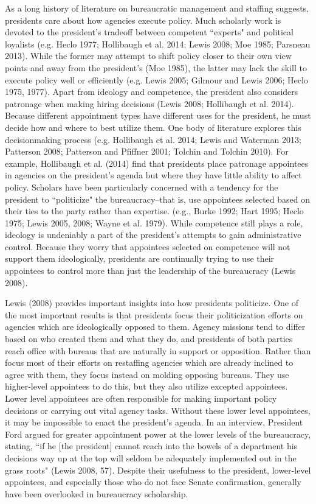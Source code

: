 \documentclass[12pt]{article}
\begin{document}
	As a long history of literature on bureaucratic management and staffing suggests, presidents care about how agencies execute policy. Much scholarly work is devoted to the president's tradeoff between competent ``experts" and political loyalists (e.g. Heclo 1977; Hollibaugh et al. 2014; Lewis 2008; Moe 1985; Parsneau 2013). While the former may attempt to shift policy closer to their own view points and away from the president's (Moe 1985), the latter may lack the skill to execute policy well or efficiently (e.g. Lewis 2005; Gilmour and Lewis 2006; Heclo 1975, 1977). Apart from ideology and competence, the president also considers patronage when making hiring decisions (Lewis 2008; Hollibaugh et al. 2014). Because different appointment types have different uses for the president, he must decide how and where to best utilize them. One body of literature explores this decisionmaking process (e.g. Hollibaugh et al. 2014; Lewis and Waterman 2013; Patterson 2008; Patterson and Pfiffner 2001; Tolchin and Tolchin 2010). For example, Hollibaugh et al. (2014) find that presidents place patronage appointees in agencies on the president's agenda but where they have little ability to affect policy. Scholars have been particularly concerned with a tendency for the president to ``politicize" the bureaucracy--that is, use appointees selected based on their ties to the party rather than expertise. (e.g., Burke 1992; Hart 1995; Heclo 1975; Lewis 2005, 2008; Wayne et al. 1979). While competence still plays a role, ideology is undeniably a part of the president's attempts to gain administrative control. Because they worry that appointees selected on competence will not support them ideologically, presidents are continually trying to use their appointees to control more than just the leadership of the bureaucracy (Lewis 2008).
	
Lewis (2008) provides important insights into how presidents politicize. One of the most important results is that presidents focus their politicization efforts on agencies which are ideologically opposed to them. Agency missions tend to differ based on who created them and what they do, and presidents of both parties reach office with bureaus that are naturally in support or opposition. Rather than focus most of their efforts on restaffing agencies which are already inclined to agree with them, they focus instead on molding opposing bureaus. They use higher-level appointees to do this, but they also utilize excepted appointees. Lower level appointees are often responsible for making important policy decisions or carrying out vital agency tasks. Without these lower level appointees, it may be impossible to enact the president's agenda. In an interview, President Ford argued for greater appointment power at the lower levels of the bureaucracy, stating, ``if he [the president] cannot reach into the bowels of a department his decisions way up at the top will seldom be adequately implemented out in the grass roots" (Lewis 2008, 57). Despite their usefulness to the president, lower-level appointees, and especially those who do not face Senate confirmation, generally have been overlooked in bureaucracy scholarship.
\end{document}
